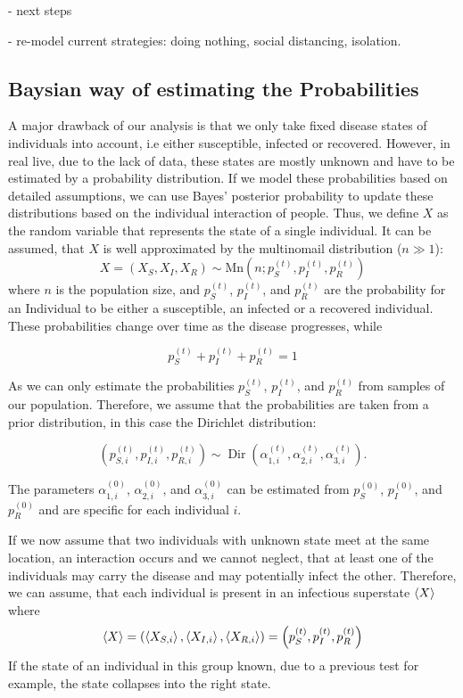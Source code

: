 - next steps

- re-model current strategies: doing nothing, social distancing, isolation.

\subsection{Baysian way of estimating the Probabilities}

A major drawback of our analysis is that we only take fixed disease states of individuals into account, i.e either susceptible, infected or recovered. However, in real live, due to the lack of data, these states are mostly unknown and have to be estimated by a probability distribution. If we model these probabilities based on detailed assumptions, we can use Bayes' posterior probability to update these distributions based on the individual interaction of people. Thus, we define $X$ as the random variable that represents the state of a single individual. It can be assumed, that $X$ is well approximated by the multinomail distribution ($n\gg1$):
\begin{equation}
    X = \left(X_{S}, X_{I}, X_{R}\right) \sim \text{Mn}(n;p_S^{(t)},p_I^{(t)},p_R^{(t)})
\end{equation}
where $n$ is the population size, and $p_S^{(t)}$, $p_I^{(t)}$, and $p_R^{(t)}$ are the probability for an Individual to be either a susceptible, an infected or a recovered individual. These probabilities change over time as the disease progresses, while

\begin{equation}
    p_S^{(t)}+p_I^{(t)}+p_R^{(t)}=1
\end{equation}

As we can only estimate the probabilities $p_S^{(t)}$, $p_I^{(t)}$, and $p_R^{(t)}$ from samples of our population. Therefore, we assume that the probabilities are taken from a prior distribution, in this case the Dirichlet distribution:

\begin{equation}
    \left(p_{S,i}^{(t)}, p_{I,i}^{(t)}, p_{R,i}^{(t)}\right) \sim \operatorname{Dir}\left(\alpha_{1,i}^{(t)}, \alpha_{2,i}^{(t)}, \alpha_{3,i}^{(t)}\right).
\end{equation}

The parameters $\alpha_{1,i}^{(0)}$, $\alpha_{2,i}^{(0)}$, and $\alpha_{3,i}^{(0)}$ can be estimated from $p_S^{(0)}$, $p_I^{(0)}$, and $p_R^{(0)}$ and are specific for each individual $i$.

If we now assume that two individuals with unknown state meet at the same location, an interaction occurs and we cannot neglect, that at least one of the individuals may carry the disease and may potentially infect the other. Therefore, we can assume, that each individual is present in an infectious superstate $\braket{X}$ where
\begin{equation}
    \braket{X} = \left(\braket{X_{S,i}}, \braket{X_{I,i}}, \braket{X_{R,i}}\right) = \left(p_S^{(t)},p_I^{(t)},p_R^{(t)}\right)
\end{equation}
If the state of an individual in this group known, due to a previous test for example, the state collapses into the right state.



